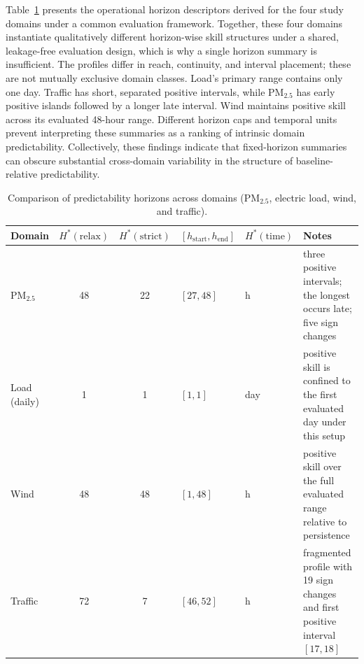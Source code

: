 \documentclass[pdflatex]{sn-jnl}
\begin{document}
Table~\ref{tab:results} presents the operational horizon descriptors
derived for the four study domains under a common evaluation framework.
Together, these four domains instantiate qualitatively different horizon-wise skill structures under a shared, leakage-free evaluation design, which is why a single horizon summary is insufficient.
The profiles differ in reach, continuity, and interval placement; these
are not mutually exclusive domain classes. Load's primary range contains
only one day. Traffic has short, separated positive intervals, while
PM$_{2.5}$ has early positive islands followed by a longer late interval.
Wind maintains positive skill across its evaluated 48-hour range.
Different horizon caps and temporal units prevent interpreting these
summaries as a ranking of intrinsic domain predictability.
Collectively, these findings indicate that fixed-horizon summaries can
obscure substantial cross-domain variability in the structure of
baseline-relative predictability.

\begin{table}[h]
\centering
\small
\setlength{\tabcolsep}{4pt}
\renewcommand{\arraystretch}{1.1}
\begin{tabularx}{\linewidth}{@{}l c c >{\centering\arraybackslash}p{1.8cm} >{\centering\arraybackslash}p{1.4cm} >{\raggedright\arraybackslash}X@{}}
\toprule
Domain & $H^*(\mathrm{relax})$ & $H^*(\mathrm{strict})$ & $[h_{\mathrm{start}}, h_{\mathrm{end}}]$ & $H^*(\mathrm{time})$ & Notes \\
\midrule
PM$_{2.5}$ & 48 & 22 & $[27,48]$ & 22 h & three positive intervals; the longest occurs late; five sign changes \\
Load (daily) & 1 & 1 & $[1,1]$ & 1 day & positive skill is confined to the first evaluated day under this setup \\
Wind & 48 & 48 & $[1,48]$ & 48 h & positive skill over the full evaluated range relative to persistence \\
Traffic & 72 & 7 & $[46,52]$ & 7 h & fragmented profile with 19 sign changes and first positive interval $[17,18]$ \\
\bottomrule
\end{tabularx}
\caption{Comparison of predictability horizons across domains (PM$_{2.5}$, electric load, wind, and traffic).}
\label{tab:results}
\end{table}
\end{document}
